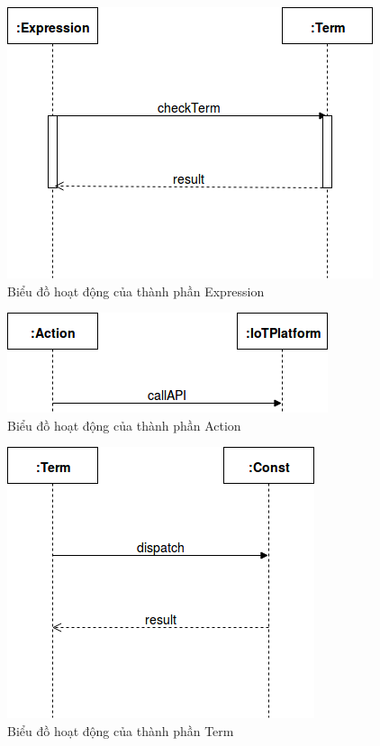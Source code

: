 \begin{figure}[h!]
	\center
	\includegraphics[scale=0.4]{image/language_diagram-expression}	
	\caption{Biểu đồ hoạt động của thành phần Expression}
\end{figure}


\begin{figure}[h!]
	\center
	\includegraphics[scale=0.4]{image/language_diagram-action}	
	\caption{Biểu đồ hoạt động của thành phần Action}
\end{figure}


\begin{figure}[h!]
	\center
	\includegraphics[scale=0.4]{image/language_diagram-term}	
	\caption{Biểu đồ hoạt động của thành phần Term}
\end{figure}


